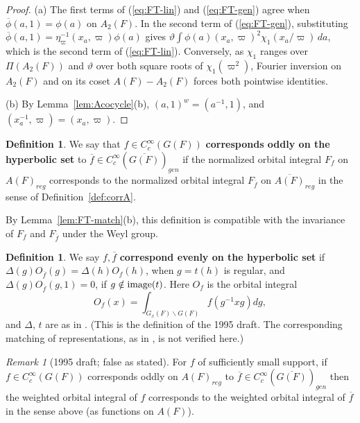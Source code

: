 \documentclass[12pt,letterpaper,openany]{book}
\theoremstyle{plain}
\theoremstyle{definition}
\newtheorem{definition}[theorem]{Definition}
\theoremstyle{remark}
\theoremstyle{remark}
\newtheorem{remyy}{Remark}
\begin{document}
\begin{proof}
(a) The first terms of (\ref{eq:FT-lin}) and (\ref{eq:FT-gen}) agree
when $\overline{\phi}(a,1)=\phi(a)$ on $A_2(F)$. In the second term of
(\ref{eq:FT-gen}), substituting
$\overline{\phi}(a,1)=\eta_\varpi^{-1}(x_a,\varpi)\phi(a)$ gives
$\vartheta\int\phi(a)(x_a,\varpi)^2\chi_1(x_a/\varpi)\,da$, which is the
second term of (\ref{eq:FT-lin}). Conversely, as $\chi_1$ ranges over
$\Pi(A_2(F))$ and $\vartheta$ over both square roots of
$\chi_1(\varpi^2)$, Fourier inversion on $A_2(F)$ and on its coset
$A(F)-A_2(F)$ forces both pointwise identities.

(b) By Lemma~\ref{lem:Acocycle}(b), $(a,1)^w=(a^{-1},1)$, and
$(x_a^{-1},\varpi)=(x_a,\varpi)$.
\end{proof}

\begin{definition} We say that
$f \in C_c^\infty(G(F))$ {\bf corresponds oddly
on the hyperbolic set} to
$\overline{f}\in C_c^\infty(\overline{G(F)})_{gen}$
if the normalized orbital integral $F_f$ on $A(F)_{reg}$ corresponds to
the normalized orbital integral $F_{\overline{f}}$ on
$\overline{A(F)}_{reg}$ in the sense of Definition~\ref{def:corrA}.
\end{definition}

By Lemma~\ref{lem:FT-match}(b), this definition is compatible with the
invariance of $F_f$ and $F_{\overline f}$ under the Weyl group.

\begin{definition}
We say $f,\overline{f}$ {\bf correspond evenly on the hyperbolic set}
if $\Delta(g)O_{\overline{f}}(g)=\Delta(h)O_f(h)$, when
$g=t(h)$ is regular, and $\Delta(g)O_{\overline{f}}(g,1)=0$,
if $g\notin {\rm image}(t)$. Here $O_f$ is the orbital integral
\[
O_f(x)=\int_{G_x(F)\backslash G(F)} f(g^{-1}xg)dg,
\]
and $\Delta$, $t$ are as in \cite{Fl}. (This is the definition of the
1995 draft. The corresponding matching of representations, as in
\cite{Fl}, is not verified here.)
\end{definition}

\begin{remyy}[1995 draft; false as stated]\label{lem:weighted-small}
For $f$ of sufficiently small support, if
$f \in C_c^\infty(G(F))$ corresponds oddly on $A(F)_{reg}$ to
$\overline{f}\in C_c^\infty(\overline{G(F)})_{gen}$
then the weighted orbital integral of
$f$ corresponds to the weighted orbital integral of
$\overline{f}$ in the sense above (as functions on $A(F)$).
\end{remyy}
\end{document}
